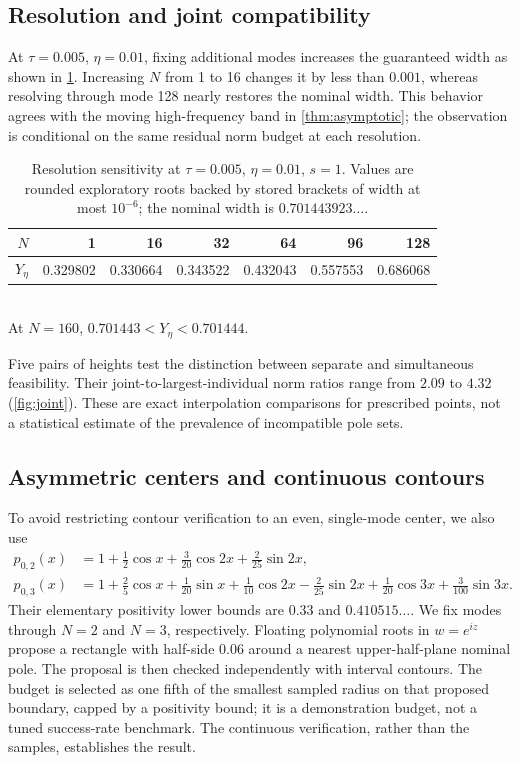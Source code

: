 \documentclass[11pt]{article}
\begin{document}
\subsection{Resolution and joint compatibility}
At $\tau=0.005$, $\eta=0.01$, fixing additional modes increases the guaranteed width as shown in \cref{tab:resolution}. Increasing $N$ from 1 to 16 changes it by less than $0.001$, whereas resolving through mode 128 nearly restores the nominal width. This behavior agrees with the moving high-frequency band in \cref{thm:asymptotic}; the observation is conditional on the same residual norm budget at each resolution.

\begin{table}[t]
\centering\small
\caption{Resolution sensitivity at $\tau=0.005$, $\eta=0.01$, $s=1$. Values are rounded exploratory roots backed by stored brackets of width at most $10^{-6}$; the nominal width is $0.701443923\ldots$.}\label{tab:resolution}
\begin{tabular}{@{}rrrrrrr@{}}\toprule
$N$ & 1 & 16 & 32 & 64 & 96 & 128\\\midrule
$Y_\eta$ & 0.329802 & 0.330664 & 0.343522 & 0.432043 & 0.557553 & 0.686068\\\bottomrule
\end{tabular}\\[4pt]
At $N=160$, $0.701443<Y_\eta<0.701444$.
\end{table}

Five pairs of heights test the distinction between separate and simultaneous feasibility. Their joint-to-largest-individual norm ratios range from $2.09$ to $4.32$ (\cref{fig:joint}). These are exact interpolation comparisons for prescribed points, not a statistical estimate of the prevalence of incompatible pole sets.

\subsection{Asymmetric centers and continuous contours}
To avoid restricting contour verification to an even, single-mode center, we also use
\begin{align*}
 p_{0,2}(x)&=1+\tfrac12\cos x+\tfrac3{20}\cos2x+\tfrac2{25}\sin2x,\\
 p_{0,3}(x)&=1+\tfrac25\cos x+\tfrac1{20}\sin x+\tfrac1{10}\cos2x
             -\tfrac2{25}\sin2x+\tfrac1{20}\cos3x+\tfrac3{100}\sin3x.
\end{align*}
Their elementary positivity lower bounds are $0.33$ and $0.410515\ldots$. We fix modes through $N=2$ and $N=3$, respectively. Floating polynomial roots in $w=e^{iz}$ propose a rectangle with half-side $0.06$ around a nearest upper-half-plane nominal pole. The proposal is then checked independently with interval contours. The budget is selected as one fifth of the smallest sampled radius on that proposed boundary, capped by a positivity bound; it is a demonstration budget, not a tuned success-rate benchmark. The continuous verification, rather than the samples, establishes the result.
\end{document}
